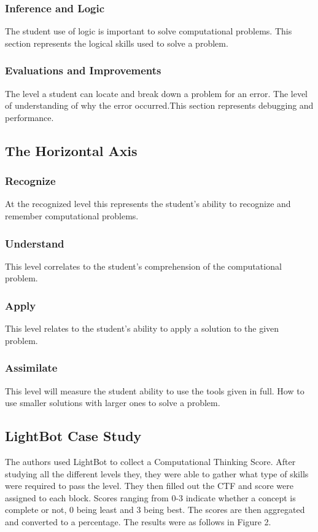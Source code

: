 \subsubsection{Inference and Logic}
The student use of logic is important to solve computational problems. This section represents the logical skills used to solve a problem.

\subsubsection{Evaluations and Improvements}
The level a student can locate and break down a problem for an error. The level of understanding of why the error occurred.This section represents debugging and performance.

\subsection{The Horizontal Axis}

\subsubsection{Recognize}
At the recognized level this represents the student's ability to recognize and remember computational problems.

\subsubsection{Understand}
This level correlates to the student's comprehension of the computational problem.

\subsubsection{Apply}
This level relates to the student's ability to apply a solution to the given problem.

\subsubsection{Assimilate}
This level will measure the student ability to use the tools given in full. How to use smaller solutions with larger ones to solve a problem.

\subsection{LightBot Case Study}
The authors used LightBot to collect a Computational Thinking Score. After studying all the different levels they, they were able to gather what type of skills were required to pass the level. They then filled out the CTF and score were assigned to each block. Scores ranging from 0-3 indicate whether a concept is complete or not, 0 being least and 3 being best. The scores are then aggregated and converted to a percentage. The results were as follows in Figure 2.

